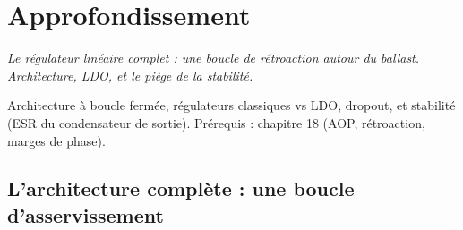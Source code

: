 \documentclass[12pt,a4paper,twoside]{book}
\begin{document}
\section{Approfondissement}

\vspace{0.3cm}
\textit{Le régulateur linéaire complet : une boucle de rétroaction autour du ballast. Architecture, LDO, et le piège de la stabilité.}
\vspace{0.3cm}

\begin{approfondissement}
Architecture à boucle fermée, régulateurs classiques vs LDO, dropout, et stabilité (ESR du condensateur de sortie). Prérequis : chapitre 18 (AOP, rétroaction, marges de phase).
\end{approfondissement}

\subsection{L'architecture complète : une boucle d'asservissement}
\end{document}
